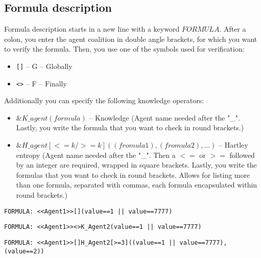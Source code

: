 \documentclass[12pt]{article}
\begin{document}
\subsection{Formula description}
Formula description starts in a new line with a keyword $FORMULA$. After a colon, you enter the agent coalition in double angle brackets, for which you want to verify the formula. Then, you use one of the symbols used for verification:
\begin{itemize}
  \item \verb+[]+ -- G -- Globally
  \item \verb+<>+ -- F -- Finally
\end{itemize}
Additionally you can specify the following knowledge operators:
\begin{itemize}
  \item $\&K{\_}agent(formula)$ -- Knowledge (Agent name needed after the "{\_}". Lastly, you write the formula that you want to check in round brackets.)
  \item $\&H{\_}agent[<=k/>=k]((fromula1), (fromula2), ...)$ -- Hartley entropy (Agent name needed after the "{\_}". Then a $<=$ or $>=$ followed by an integer are required, wrapped in square brackets. Lastly, you write the formulas that you want to check in round brackets. Allows for listing more than one formula, separated with commas, each formula encapsulated within round brackets.)
\end{itemize}
\begin{lstlisting}[title={A formula that checks if there is a strategy that globally Agent1 could take such actions that the value will be always equal to 1 or 7777.}]
  FORMULA: <<Agent1>>[](value==1 || value==7777)
\end{lstlisting}
\begin{lstlisting}[title={A formula that uses a knowledge operator.}]
  FORMULA: <<Agent1>><>K_Agent2(value==1 || value==7777)
\end{lstlisting}
\begin{lstlisting}[title={A formula that uses a Hartley operator.}]
  FORMULA: <<Agent1>>[]H_Agent2[>=3]((value==1 || value==7777),(value==2))
\end{lstlisting}
\end{document}
